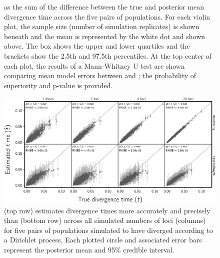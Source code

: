 \documentclass[letterpaper,12pt]{article}
\begin{document}
\begin{figure}[htbp]
\begin{center}
{            as the sum of the difference between the true and posterior mean
            divergence time across the five pairs of populations.
            For each violin plot, the sample size (number of simulation
            replicates) is shown beneath and the mean is represented by the
            white dot and shown above.
            The box shows the upper and lower quartiles and the brackets
            show the 2.5th and 97.5th percentiles.
            At the top center of each plot, the results of a Mann-Whitney U
            test \citep{MannWhitney1947} are shown comparing mean model errors
            between \ecoevolity and \dppmsbayes;
            the probability of superiority \citep[PoS, the probability that
            \ecoevolity has a lower mean model error than \dppmsbayes for a
            random simulation replicate drawn from
            each;][]{WolfeHogg1971,Grissom1994} and p-value is provided.
        }
        \label{fig:divtimeerror}
    \end{center}
\end{figure}

\begin{figure}[htbp]
    \begin{center}
        \includegraphics[width=\textwidth,height=\textheight,keepaspectratio]{../images/from-project-repo/plots/free-div-time-scatter-cropped.pdf}
        \caption{
            \Ecoevolity (top row) estimates divergence times more accurately
            and precisely than \dppmsbayes (bottom row) across all simulated
            numbers of loci (columns) for five pairs of populations simulated
            to have diverged according to a Dirichlet process.
            Each plotted circle and associated error bars represent the posterior mean
            and 95\% credible interval.
            \accuracyscatterplotannotations{\comparisonetime{}}
        }
        \label{fig:divtimeerrordp}
    \end{center}
\end{figure}
\end{document}
